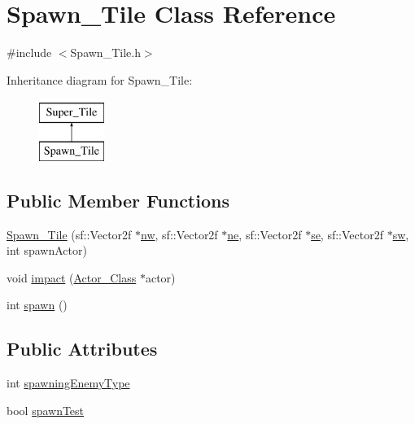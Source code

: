 \hypertarget{class_spawn___tile}{}\section{Spawn\+\_\+\+Tile Class Reference}
\label{class_spawn___tile}


{\ttfamily \#include $<$Spawn\+\_\+\+Tile.\+h$>$}

Inheritance diagram for Spawn\+\_\+\+Tile\+:\begin{figure}[H]
\begin{center}
\leavevmode
\includegraphics[height=2.000000cm]{class_spawn___tile}
\end{center}
\end{figure}
\subsection*{Public Member Functions}
\begin{DoxyCompactItemize}
\item 
\hyperlink{class_spawn___tile_a9491bac6cc501fb9f0febde42533fc1d}{Spawn\+\_\+\+Tile} (sf\+::\+Vector2f $\ast$\hyperlink{class_super___tile_ad6bcea1fd54f67808f54ba2aacd88596}{nw}, sf\+::\+Vector2f $\ast$\hyperlink{class_super___tile_a55f6d2860da36f13019bd4e0d18364ca}{ne}, sf\+::\+Vector2f $\ast$\hyperlink{class_super___tile_ab384b89a7a631b8b75c4d405c51a23e1}{se}, sf\+::\+Vector2f $\ast$\hyperlink{class_super___tile_abe9efe0c3d1ed440395225843435dfc8}{sw}, int spawn\+Actor)
\item 
void \hyperlink{class_spawn___tile_a9b557377a8afd06512ac19368a4f14a4}{impact} (\hyperlink{class_actor___class}{Actor\+\_\+\+Class} $\ast$actor)
\item 
int \hyperlink{class_spawn___tile_a97168cfea2f8de79a6342c4b46d7eaf8}{spawn} ()
\end{DoxyCompactItemize}
\subsection*{Public Attributes}
\begin{DoxyCompactItemize}
\item 
int \hyperlink{class_spawn___tile_a43dfdce45bb37685e75666e3ec7331d1}{spawning\+Enemy\+Type}
\item 
bool \hyperlink{class_spawn___tile_a3007d9023153c7b33a16398f4de74dc7}{spawn\+Test}
\end{DoxyCompactItemize}



